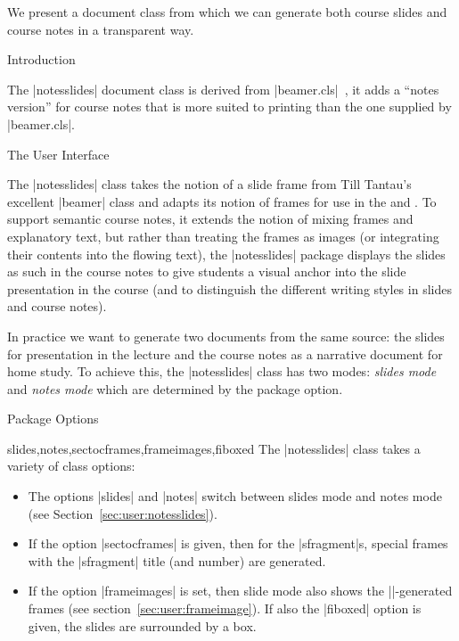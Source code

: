 We present a document class from which we can generate both course slides and course notes
in a transparent way.

\begin{sfragment}{Introduction}

  The |notesslides| document class is derived from |beamer.cls|~\cite{beamerclass:on}, it
  adds a ``notes version'' for course notes that is more suited to printing than the one
  supplied by |beamer.cls|.
\end{sfragment}

\begin{sfragment}[id=sec:user]{The User Interface}

The |notesslides| class takes the notion of a slide frame from Till Tantau's excellent
|beamer| class and adapts its notion of frames for use in the \sTeX and \omdoc. To
support semantic course notes, it extends the notion of mixing frames and explanatory
text, but rather than treating the frames as images (or integrating their contents into
the flowing text), the |notesslides| package displays the slides as such in the course
notes to give students a visual anchor into the slide presentation in the course (and to
distinguish the different writing styles in slides and course notes).

In practice we want to generate two documents from the same source: the slides for
presentation in the lecture and the course notes as a narrative document for home
study. To achieve this, the |notesslides| class has two modes: \emph{slides mode} and
\emph{notes mode} which are determined by the package option. 

\begin{sfragment}[id=sec:user:options]{Package Options}

\begin{variable}{slides,notes,sectocframes,frameimages,fiboxed}
  The |notesslides| class takes a variety of class options: 
  \begin{itemize}
  \item The options |slides| and |notes| switch between slides mode and notes mode (see
    Section~\ref{sec:user:notesslides}).
  \item If the option |sectocframes| is given, then for the |sfragment|s, special frames
    with the |sfragment| title (and number) are generated.
  \item If the option |frameimages| is set, then slide mode also shows the
    |\frameimage|-generated frames (see section~\ref{sec:user:frameimage}). If also the
    |fiboxed| option is given, the slides are surrounded by a box.
  \end{itemize}
\end{variable}
\end{sfragment}


\end{sfragment}
